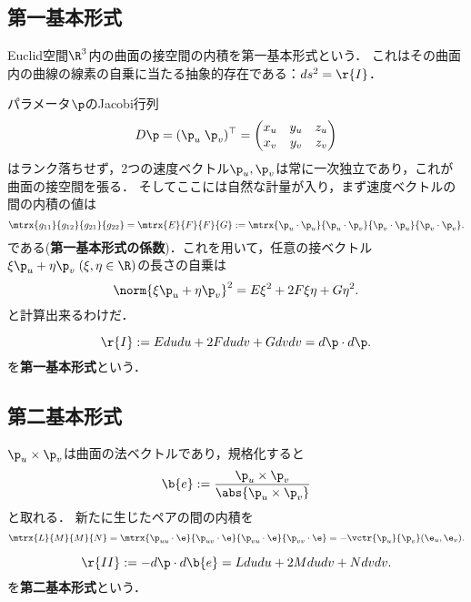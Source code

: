 \documentclass[uplatex,dvipdfmx]{jsreport}
\begin{document}
\subsection{第一基本形式}

\begin{tcolorbox}[colframe=ForestGreen, colback=ForestGreen!10!white,breakable,colbacktitle=ForestGreen!40!white,coltitle=black,fonttitle=\bfseries\sffamily,
title=]
    Euclid空間$\R^3$内の曲面の接空間の内積を第一基本形式という．
    これはその曲面内の曲線の線素の自乗に当たる抽象的存在である：$ds^2=\r{I}$．
\end{tcolorbox}

\begin{observation}[曲面の接平面の様子]
    パラメータ$\p$のJacobi行列
    \[D\p=(\p_u\;\p_v)^\top=\begin{pmatrix}x_u&y_u&z_u\\x_v&y_v&z_v\end{pmatrix}\]
    はランク落ちせず，2つの速度ベクトル$\p_u,\p_v$は常に一次独立であり，これが曲面の接空間を張る．
    そしてここには自然な計量が入り，まず速度ベクトルの間の内積の値は
    \[\mtrx{g_{11}}{g_{12}}{g_{21}}{g_{22}}=\mtrx{E}{F}{F}{G}:=\mtrx{\p_u\cdot\p_u}{\p_u\cdot\p_v}{\p_v\cdot\p_u}{\p_v\cdot\p_v}.\]
    である(\textbf{第一基本形式の係数})．これを用いて，任意の接ベクトル$\xi\p_u+\eta\p_v\;(\xi,\eta\in\R)$の長さの自乗は
    \[\norm{\xi\p_u+\eta\p_v}^2=E\xi^2+2F\xi\eta+G\eta^2.\]
    と計算出来るわけだ．
\end{observation}

\begin{definition}
    \[\r{I}:=Edudu+2Fdudv+Gdvdv=d\p\cdot d\p.\]
    を\textbf{第一基本形式}という．
\end{definition}

\subsection{第二基本形式}

\begin{observation}
    $\p_u\times\p_v$は曲面の法ベクトルであり，規格化すると
    \[\b{e}:=\frac{\p_u\times\p_v}{\abs{\p_u\times\p_v}}\]
    と取れる．
    新たに生じたペアの間の内積を
    \[\mtrx{L}{M}{M}{N}=\mtrx{\p_{uu}\cdot\e}{\p_{uv}\cdot\e}{\p_{vu}\cdot\e}{\p_{vv}\cdot\e}=-\vctr{\p_u}{\p_v}(\e_u,\e_v).\]
\end{observation}

\begin{definition}
    \[\r{II}:=-d\p\cdot d\b{e}=Ldudu+2Mdudv+Ndvdv.\]
    を\textbf{第二基本形式}という．
\end{definition}
\end{document}
